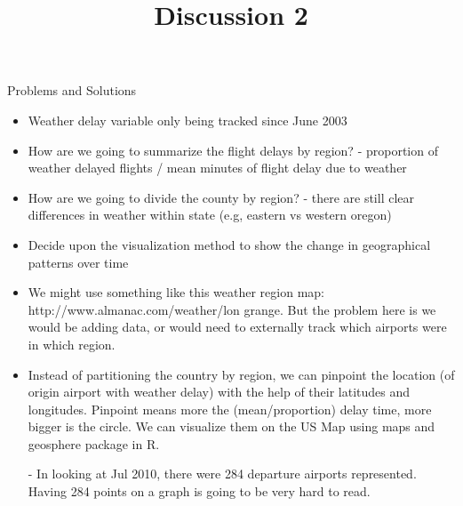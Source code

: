 \documentclass[12pt]{article}
\begin{document}
\title{Discussion 2}
\maketitle

Problems and Solutions

\begin{itemize}
\item Weather delay variable only being tracked since June 2003

\item How are we going to summarize the flight delays by region? - proportion of weather delayed flights / mean minutes of flight delay due to weather

\item How are we going to divide the county by region? - there are still clear differences in weather within state (e.g, eastern vs western oregon)

\item Decide upon the visualization method to show the change in geographical patterns over time

\end{itemize}



\begin{itemize}

\item We might use something like this weather region map: http://www.almanac.com/weather/lon
grange. But the problem here is we would be adding data, or would need to externally track which airports were in which region.

\item Instead of partitioning the country by region, we can pinpoint the location (of origin airport with weather delay) with the help of their latitudes and longitudes. Pinpoint means more the (mean/proportion) delay time, more bigger is the circle. We can visualize them on the US Map using maps and geosphere package in R. 

- In looking at  Jul 2010, there were 284 departure airports represented. Having 284 points on a graph is going to be very hard to read.

\end{itemize}
\end{document}
